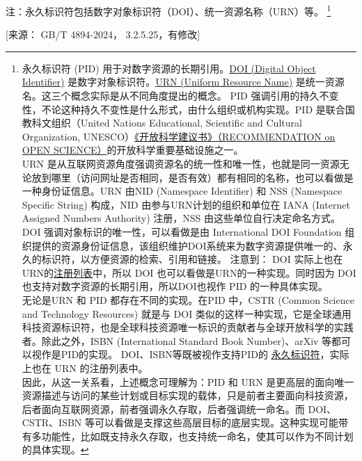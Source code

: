 \documentclass[twoside]{article}%
\begin{document}
{\mbox{}{\small 注：永久标识符包括数字对象标识符（DOI）、统一资源名称（URN）等。
\footnote{永久标识符 (PID) 用于对数字资源的长期引用。\href{https://doi.org}{DOI (Digital Object Identifier)} 是数字对象标识符。\href{https://rfc-editor.org/rfc/rfc8141}{URN (Uniform Resource Name)} 是统一资源名。这三个概念实际是从不同角度提出的概念。\newline
PID 强调引用的持久不变性，不论这种持久不变性是什么形式，由什么组织或机构实现。PID 是联合国教科文组织（United Nations Educational, Scientific and Cultural Organization, UNESCO）\href{https://unesco.org/en/legal-affairs/recommendation-open-science}{《开放科学建议书》（RECOMMENDATION on OPEN SCIENCE）}的开放科学重要基础设施之一。\\
URN 是从互联网资源角度强调资源名的统一性和唯一性，也就是同一资源无论放到哪里（访问网址是否相同，是否有效）都有相同的名称，也可以看做是一种身份证信息。URN 由NID (Namespace Identifier) 和 NSS (Namespace Specific String) 构成，NID 由参与URN计划的组织和单位在 IANA (Internet Assigned Numbers Authority) 注册，NSS 由这些单位自行决定命名方式。\newline
DOI 强调对象标识的唯一性，可以看做是由 International DOI Foundation 组织提供的资源身份证信息，该组织维护DOI系统来为数字资源提供唯一的、永久的标识符，以方便资源的检索、引用和链接。\newline
注意到：
DOI 实际上也在URN的\href{https://www.iana.org/assignments/urn-namespaces/urn-namespaces.xhtml}{注册列表}中，所以 DOI 也可以看做是URN的一种实现。同时因为 DOI 也支持对数字资源的长期引用，所以DOI也视作 PID 的一种具体实现。\\
无论是URN 和 PID 都存在不同的实现。在PID 中，CSTR (Common Science and Technology Resources) 就是与 DOI 类似的这样一种实现，它是全球通用科技资源标识符，也是全球科技资源唯一标识的贡献者与全球开放科学的实践者。除此之外，ISBN (International Standard Book Number)、arXiv 等都可以视作是PID的实现。
DOI、ISBN等既被视作支持PID的
\href{https://pub.orcid.org/v3.0/identifiers}{永久标识符}，实际上也在 URN 的注册列表中。\\
因此，从这一关系看，上述概念可理解为：PID 和 URN 是更高层的面向唯一资源描述与访问的某些计划或目标实现的载体，只是前者主要面向科技资源，后者面向互联网资源，前者强调永久存取，后者强调统一命名。而 DOI、CSTR、ISBN 等可以看做是支撑这些高层目标的底层实现。这种实现可能带有多功能性，比如既支持永久存取，也支持统一命名，使其可以作为不同计划的具体实现。}
\par}

[来源： GB/T 4894-2024， 3.2.5.25，有修改]

}
\end{document}
